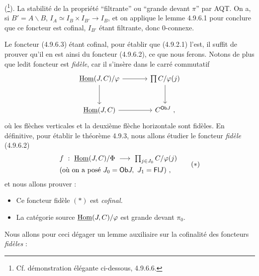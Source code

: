 (\footnote[98]{Cf. démonstration élégante ci-dessous, 4.9.6.6.}). La stabilité de la propriété “filtrante” ou “grande devant $\pi$” par AQT. On a, si $B' = A\backslash B$, $I_A \simeq I_B \times I_{B'} \longrightarrow I_B$, et on applique le lemme 4.9.6.1 pour conclure que ce foncteur est cofinal, $I_{B'}$ étant filtrante, donc 0-connexe.

Le foncteur (4.9.6.3) étant cofinal, pour établir que (4.9.2.1) l'est, il suffit de prouver qu'il en est ainsi du foncteur (4.9.6.2), ce que nous ferons. Notons de plus que ledit foncteur est \textit{fidèle}, car il s'insère dans le carré commutatif
\[
\begin{tikzcd}[column sep=large, row sep=large]
\uHom(J,C)/\varphi \arrow[r] \arrow[d] & \prod C/\varphi(j) \arrow[d] \\
\uHom(J,C) \arrow[r] & C^{\Ob J}\ ,
\end{tikzcd}
\]
où les flèches verticales et la deuxième flèche horizontale sont fidèles. En définitive, pour établir le théorème 4.9.3, nous allons étudier le foncteur \textit{fidèle} (4.9.6.2)
\[
\begin{aligned}
&f \ : \ \uHom(J,C)/\Phi \ \longrightarrow \ \textstyle\prod_{j \in J_0} C/\varphi(j) \\ %
&\text{(où on a posé } J_0 = \Ob J,\ J_1 = \Fl J) \ ,
\end{aligned}
\tag*{$(*)$}
\]
et nous allons prouver :
\begin{itemize}[label={}]
\item[\textcircled{a}] Ce foncteur fidèle $(*)$ est \textit{cofinal.}
\item[\textcircled{b}] La catégorie source $\underline{\operatorname{Hom}}(J,C)/\varphi$ est grande devant $\pi_0$.
\end{itemize}
Nous allons pour ceci dégager un lemme auxiliaire sur la cofinalité des foncteurs \textit{fidèles} :

